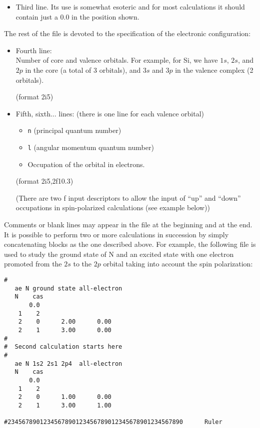 \documentclass[11pt]{article}
\begin{document}
\begin{itemize}
	(format 3x,a2,3x,a2,a1,2x)

\item Third line. Its use is somewhat esoteric and for most
		calculations it should contain just a 0.0 in the
		position shown.
\end{itemize}

The rest of the file is devoted to the specification of the electronic
configuration:

\begin{itemize} 

\item Fourth line:\\
	 Number of core and valence orbitals. For example, for Si, we
	have $1s$, $2s$, and $2p$ in the core (a total of 3 orbitals), and
	$3s$ and $3p$ in the valence complex (2 orbitals).

	(format 2i5)

\item Fifth, sixth... lines: (there is one line for each valence
orbital)
	\begin{itemize}
	\item {\tt n} (principal quantum number)
	\item {\tt l} (angular momentum quantum number)
	\item Occupation of the orbital in electrons. 
	\end{itemize}

	(format 2i5,2f10.3)

	(There are two f input descriptors to allow the input of ``up''
	and ``down'' occupations in spin-polarized calculations (see
	example below))

\end{itemize}

Comments or blank lines may appear in the file at the beginning and at the end.
It is possible to perform two or more calculations in
succession by simply concatenating blocks as the one described above.
For example, the following file is used to study the ground state of N
and an excited state with one electron promoted from the $2s$ to the $2p$
orbital taking into account the spin polarization:

\begin{verbatim}
#
   ae N ground state all-electron
   N    cas
       0.0
    1    2
    2    0      2.00      0.00
    2    1      3.00      0.00
#
#  Second calculation starts here
#
   ae N 1s2 2s1 2p4  all-electron
   N    cas
       0.0
    1    2
    2    0      1.00      0.00
    2    1      3.00      1.00

#2345678901234567890123456789012345678901234567890      Ruler
\end{verbatim}
\end{document}
